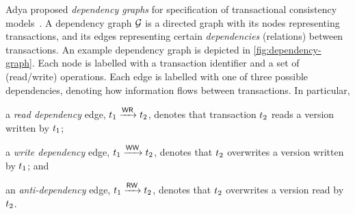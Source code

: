 %

Adya \etal proposed \emph{dependency graphs} for specification of transactional consistency models~\cite{adya-icde,adya}. 
A dependency graph $\mathcal{G}$ is a directed graph with its 
nodes representing transactions, 
and its edges representing certain \emph{dependencies} (relations) between transactions. 
An example dependency graph is depicted in \cref{fig:dependency-graph}. 
Each node is labelled with a transaction identifier and a set of (read/write) operations. 
Each edge is labelled with one of three possible dependencies, denoting how information flows between transactions. 
In particular,
\begin{enumerate*}
	\item a \emph{read dependency} edge, $t_1 \xrightarrow{\mathsf{WR}} t_2$, denotes
that transaction $t_2$ reads a version written by $t_1$;
	\item a \emph{write dependency} edge, $t_1 \xrightarrow{\mathsf{WW}} t_2$, denotes that $t_2$ overwrites a version written by $t_1$; and 
	\item an \emph{anti-dependency} edge, $t_1 \xrightarrow{\mathsf{RW}} t_2$, denotes that $t_2$ overwrites a version read by $t_2$. 
\end{enumerate*}

